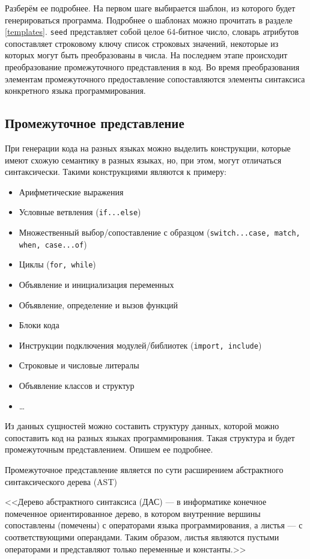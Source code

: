 Разберём ее подробнее. На первом шаге выбирается шаблон, из которого будет генерироваться
программа. Подробнее о шаблонах можно прочитать в разделе \ref{templates}.
\texttt{seed} представляет собой целое
64-битное число, словарь атрибутов сопоставляет строковому ключу список строковых значений,
некоторые из которых могут быть преобразованы в числа.
На последнем этапе происходит преобразование промежуточного представления в код. Во время преобразования
элементам промежуточного предоставление сопоставляются элементы синтаксиса конкретного языка программирования.


\subsection{Промежуточное представление}
При генерации кода на разных языках можно выделить конструкции, которые имеют схожую
семантику в разных языках, но, при этом, могут отличаться синтаксически. Такими
конструкциями являются к примеру:

\begin{itemize}
    \item Арифметические выражения
    \item Условные ветвления (\texttt{if...else})
    \item Множественный выбор/сопоставление с образцом (\texttt{switch...case, match, when, case...of})
    \item Циклы (\texttt{for, while})
    \item Объявление и инициализация переменных
    \item Объявление, определение и вызов функций
    \item Блоки кода
    \item Инструкции подключения модулей/библиотек (\texttt{import, include})
    \item Строковые и числовые литералы
    \item Объявление классов и структур
    \item \dots
\end{itemize}
\label{syntax-items}

Из данных сущностей можно составить структуру данных, которой можно сопоставить код
на разных языках программирования. Такая структура и будет промежуточным представлением.
Опишем ее подробнее.

Промежуточное представление является по сути расширением абстрактного синтаксического
дерева (AST)

<<Дерево абстрактного синтаксиса (ДАС) — в информатике конечное помеченное ориентированное дерево, в котором внутренние вершины сопоставлены (помечены) с операторами языка программирования, а листья — с соответствующими операндами. Таким образом, листья являются пустыми операторами и представляют только переменные и константы.>> \cite{ast}

